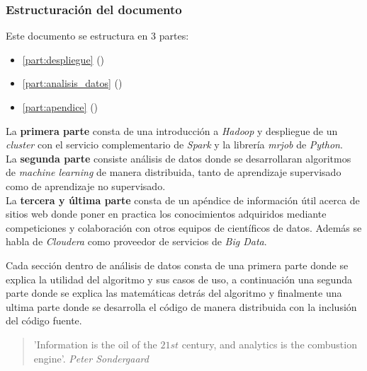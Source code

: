 \subsubsection*{Estructuración del documento}
Este documento se estructura en 3 partes:
\begin{itemize}
  \item \autoref{part:despliegue} ()
  \item \autoref{part:analisis_datos} ()
  \item \autoref{part:apendice} ()
\end{itemize}
La \textbf{primera parte} consta de una introducción a \textit{Hadoop} y despliegue de un \textit{cluster} con el servicio
complementario de \textit{Spark} y la librería \textit{mrjob} de \textit{Python}.\\
La \textbf{segunda parte} consiste análisis de datos donde se desarrollaran algoritmos de 
\textit{machine learning} de manera distribuida, tanto de aprendizaje supervisado como de aprendizaje no supervisado.\\
La \textbf{tercera y última parte} consta de un apéndice de información útil acerca de sitios web 
donde poner en practica los conocimientos adquiridos mediante competiciones y colaboración con otros equipos de
científicos de datos. Además se habla de \textit{Cloudera} como proveedor de servicios de \textit{Big Data}.
\newline

Cada sección dentro de análisis de datos consta de una primera parte donde se explica la utilidad del algoritmo 
y sus casos de uso, a continuación una segunda parte donde se explica las matemáticas detrás del algoritmo y 
finalmente una ultima parte donde se desarrolla el código de manera distribuida con la inclusión del código fuente.

\vspace*{1.5cm}

\begin{quote}
    'Information is the oil of the $21st$ century, and analytics is the combustion engine'.
	 \newline \raggedleft \textit{Peter Sondergaard}
\end{quote}

\clearpage